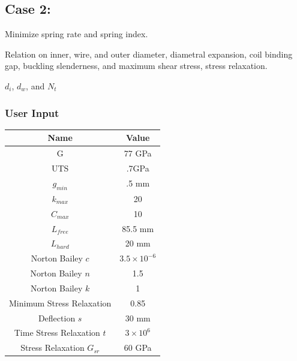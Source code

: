 \documentclass[10pt]{article}
\begin{document}
	
	
	

\newpage
\subsection{Case 2:}
\label{subsec:Case2}

\begin{description}[leftmargin=!,labelwidth=\widthof{\bfseries State Variables:}, labelindent = 1cm]
	\item[Objectives:] Minimize spring rate and spring index.\\
	\item[Constraints:] Relation on inner, wire, and outer diameter, diametral expansion, coil binding gap, buckling slenderness, and maximum shear stress, stress relaxation. \\
	\item[State Variables:] $d_{i}$, $d_{w}$, and $N_{t}$ \\
\end{description}

	\subsubsection{User Input}
	
\begin{center}
	 \begin{tabular}{| c  | c |  }
	 	\hline Name & Value\\
	 	\hline G & 77 GPa \\
		\hline UTS & .7GPa \\
		\hline $g_{min}$ & .5 mm\\ 
	 	\hline $k_{max}$ & 20\\
		\hline $C_{max}$ & 10\\
		\hline $L_{free}$ & 85.5 mm\\
		\hline $L_{hard}$ & 20 mm\\
		\hline Norton Bailey $c$& $ 3.5 \times 10^{-6}$ \\
		\hline Norton Bailey $n$ & 1.5\\
		\hline Norton Bailey $k$ & 1 \\
		\hline Minimum Stress Relaxation & 0.85\\
		\hline Deflection $s$ & 30 mm\\
		\hline Time Stress Relaxation $t$  & $3 \times 10^{6}$\\
		\hline Stress Relaxation $G_{sr}$ & 60 GPa\\
		\hline
	 \end{tabular}
\end{center}
\end{document}
